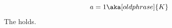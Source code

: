 \documentclass{article}
\begin{document}
\begin{equation} a=1 \aka[old phrase]{K} \end{equation}
The  holds.
\end{document}
